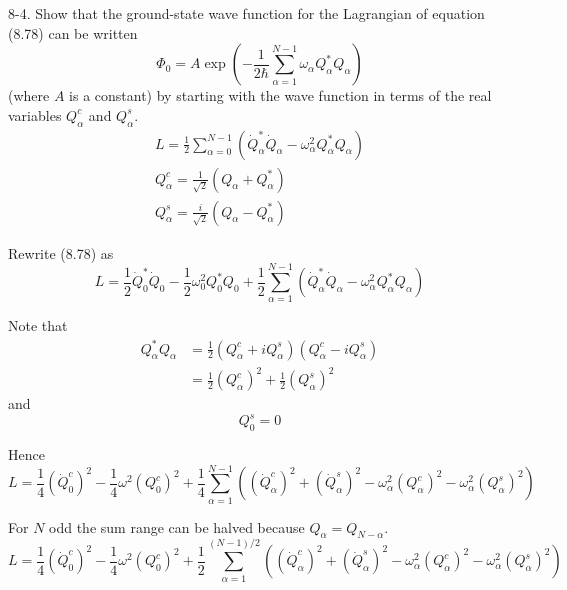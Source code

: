 \documentclass[12pt]{article}
\begin{document}
8-4.
Show that the ground-state wave function for the Lagrangian of
equation (8.78) can be written
\begin{equation*}
\Phi_0=A\exp\left(
-\frac{1}{2\hbar}
\sum_{\alpha=1}^{N-1}
\omega_\alpha Q_\alpha^*Q_\alpha
\right)
\tag{8.83}
\end{equation*}
(where $A$ is a constant) by starting with the wave function in terms of
the real variables $Q_\alpha^c$ and $Q_\alpha^s$.
\begin{gather*}
L=\frac{1}{2}\sum_{\alpha=0}^{N-1}
\left(\dot Q_\alpha^*\dot Q_\alpha-\omega_\alpha^2Q_\alpha^*Q_\alpha\right)
\tag{8.78}
\\
Q_\alpha^c=\frac{1}{\sqrt2}(Q_\alpha+Q_\alpha^*)
\tag{8.79}
\\
Q_\alpha^s=\frac{i}{\sqrt2}(Q_\alpha-Q_\alpha^*)
\tag{8.80}
\end{gather*}

Rewrite (8.78) as
\begin{equation*}
L=\frac{1}{2}\dot Q_0^*\dot Q_0
-\frac{1}{2}\omega_0^2Q_0^*Q_0
+\frac{1}{2}\sum_{\alpha=1}^{N-1}
\left(\dot Q_\alpha^*\dot Q_\alpha-\omega_\alpha^2Q_\alpha^*Q_\alpha\right)
\end{equation*}

Note that
\begin{align*}
Q_\alpha^*Q_\alpha
&=\frac{1}{2}(Q_\alpha^c+iQ_\alpha^s)(Q_\alpha^c-iQ_\alpha^s)
\\
&=\frac{1}{2}(Q_\alpha^c)^2+\frac{1}{2}(Q_\alpha^s)^2
\end{align*}
and
\begin{equation*}
Q_0^s=0
\end{equation*}

Hence
\begin{equation*}
L=\frac{1}{4}(\dot Q_0^c)^2-\frac{1}{4}\omega^2(Q_0^c)^2
+\frac{1}{4}\sum_{\alpha=1}^{N-1}
\left(
(\dot Q_\alpha^c)^2
+(\dot Q_\alpha^s)^2
-\omega_\alpha^2(Q_\alpha^c)^2
-\omega_\alpha^2(Q_\alpha^s)^2
\right)
\end{equation*}

For $N$ odd the sum range can be halved because $Q_\alpha=Q_{N-\alpha}$.
\begin{equation*}
L=\frac{1}{4}(\dot Q_0^c)^2-\frac{1}{4}\omega^2(Q_0^c)^2
+\frac{1}{2}\sum_{\alpha=1}^{(N-1)/2}
\left(
(\dot Q_\alpha^c)^2
+(\dot Q_\alpha^s)^2
-\omega_\alpha^2(Q_\alpha^c)^2
-\omega_\alpha^2(Q_\alpha^s)^2
\right)
\end{equation*}

\end{document}
